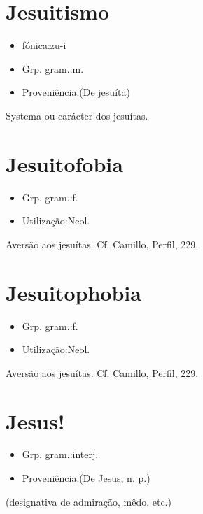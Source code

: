 \documentclass{article}
\begin{document}
\section{Jesuitismo}
\begin{itemize}
\item {fónica:zu-i}
\end{itemize}
\begin{itemize}
\item {Grp. gram.:m.}
\end{itemize}
\begin{itemize}
\item {Proveniência:(De \textunderscore jesuíta\textunderscore )}
\end{itemize}
Systema ou carácter dos jesuítas.
\section{Jesuitofobia}
\begin{itemize}
\item {Grp. gram.:f.}
\end{itemize}
\begin{itemize}
\item {Utilização:Neol.}
\end{itemize}
Aversão aos jesuítas. Cf. Camillo, \textunderscore Perfil\textunderscore , 229.
\section{Jesuitophobia}
\begin{itemize}
\item {Grp. gram.:f.}
\end{itemize}
\begin{itemize}
\item {Utilização:Neol.}
\end{itemize}
Aversão aos jesuítas. Cf. Camillo, \textunderscore Perfil\textunderscore , 229.
\section{Jesus!}
\begin{itemize}
\item {Grp. gram.:interj.}
\end{itemize}
\begin{itemize}
\item {Proveniência:(De \textunderscore Jesus\textunderscore , n. p.)}
\end{itemize}
(designativa de \textunderscore admiração\textunderscore , \textunderscore mêdo\textunderscore , etc.)
\end{document}
